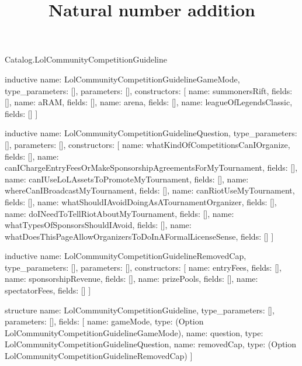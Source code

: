 \begin{lexlean}{Catalog.LolCommunityCompetitionGuideline}
\title{Natural number addition}
\begin{semanticmodule}
inductive{
  name: LolCommunityCompetitionGuidelineGameMode,
  type_parameters: [],
  parameters: [],
  constructors: [
    {name: summonersRift, fields: []},
    {name: aRAM, fields: []},
    {name: arena, fields: []},
    {name: leagueOfLegendsClassic, fields: []}
  ]
}

inductive{
  name: LolCommunityCompetitionGuidelineQuestion,
  type_parameters: [],
  parameters: [],
  constructors: [
    {name: whatKindOfCompetitionsCanIOrganize, fields: []},
    {name: canIChargeEntryFeesOrMakeSponsorshipAgreementsForMyTournament, fields: []},
    {name: canIUseLoLAssetsToPromoteMyTournament, fields: []},
    {name: whereCanIBroadcastMyTournament, fields: []},
    {name: canRiotUseMyTournament, fields: []},
    {name: whatShouldIAvoidDoingAsATournamentOrganizer, fields: []},
    {name: doINeedToTellRiotAboutMyTournament, fields: []},
    {name: whatTypesOfSponsorsShouldIAvoid, fields: []},
    {name: whatDoesThisPageAllowOrganizersToDoInAFormalLicenseSense, fields: []}
  ]
}

inductive{
  name: LolCommunityCompetitionGuidelineRemovedCap,
  type_parameters: [],
  parameters: [],
  constructors: [
    {name: entryFees, fields: []},
    {name: sponsorshipRevenue, fields: []},
    {name: prizePools, fields: []},
    {name: spectatorFees, fields: []}
  ]
}

structure{
  name: LolCommunityCompetitionGuideline,
  type_parameters: [],
  parameters: [],
  fields: [
    {name: gameMode, type: (Option LolCommunityCompetitionGuidelineGameMode)},
    {name: question, type: LolCommunityCompetitionGuidelineQuestion},
    {name: removedCap, type: (Option LolCommunityCompetitionGuidelineRemovedCap)}
  ]
}
\end{semanticmodule}
\end{lexlean}
